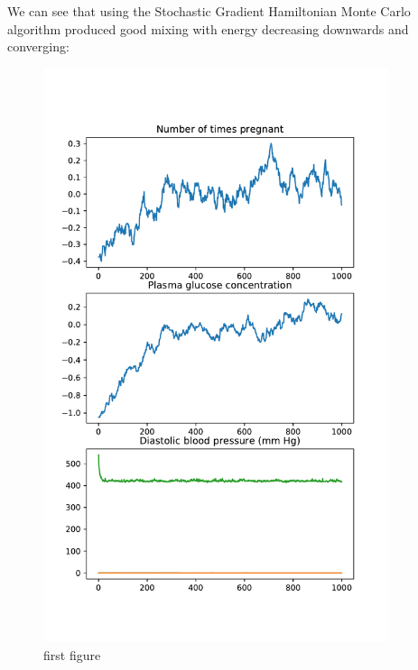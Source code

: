 We can see that using the Stochastic Gradient Hamiltonian Monte Carlo algorithm produced good mixing with energy decreasing downwards and converging:

\begin{figure}[H]
	\centering
	\begin{minipage}{0.45\textwidth}
		\centering
		\includegraphics[width=0.9\textwidth]{sghmc-energy-pima.pdf} %
		\caption{first figure}
	\end{minipage}\hfill
	\begin{minipage}{0.45\textwidth}
		\centering

\end{minipage}
\end{figure}
